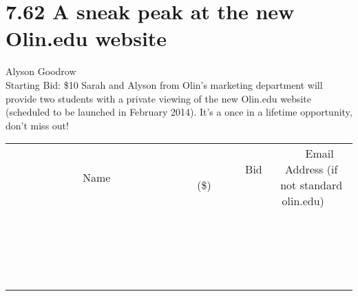 \documentclass[11pt]{article}
\begin{document}
\section*{7.62 A sneak peak at the new Olin.edu website}
Alyson Goodrow
\\
Starting Bid: \$10
\newline
Sarah and Alyson from Olin's marketing department will provide two students with a private viewing of the new Olin.edu website (scheduled to be launched in February 2014). It's a once in a lifetime opportunity, don't miss out!
\\[3ex]
\begin{tabular}{c c c}
~~~~~~~~~~~~~Name~~~~~~~~~~~~~ & ~~~~~~~~~Bid (\$)~~~~~~~~~  & ~~~Email Address (if not standard olin.edu)~~~\\
 & & \\
\hline
 & & \\
\hline
 & & \\
\hline
 & & \\
\hline
 & & \\
\hline
 & & \\
\hline
 & & \\
\hline
 & & \\
\hline
 & & \\
\hline
 & & \\
\hline
 & & \\
\hline
 & & \\
\hline
 & & \\
\hline
 & & \\
\hline
 & & \\
\hline
 & & \\
\hline
 & & \\
\hline
 & & \\
\hline
 & & \\
\hline
\end{tabular}
\newpage
\end{document}
